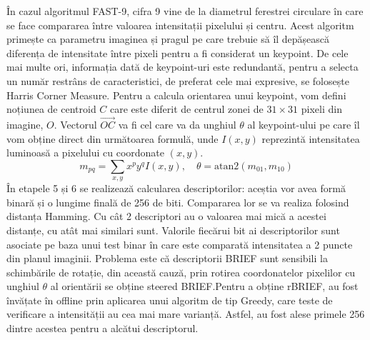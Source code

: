\documentclass[12pt,a4paper]{report}
\begin{document}
În cazul algoritmul FAST-9, cifra 9 vine de la diametrul ferestrei circulare în care se face compararea între valoarea 
intensitații pixelului și centru. Acest algoritm primește ca parametru imaginea și pragul 
pe care trebuie să îl depășească diferența de intensitate între pixeli pentru a fi considerat
un keypoint. De cele mai multe ori, informația dată de keypoint-uri este redundantă, pentru
a selecta un număr restrâns de caracteristici, de preferat cele mai expresive, se folosește Harris
Corner Measure. Pentru a calcula orientarea unui keypoint, vom defini noțiunea de centroid  $ C $ 
care este diferit de centrul zonei de $ 31 \times 31 $ pixeli din imagine, $ O $. Vectorul $ \vec{OC} $ va fi cel 
care va da unghiul $ \theta $ al keypoint-ului pe care îl vom obține direct din următoarea 
formulă, unde $ I(x, y) $ reprezintă intensitatea luminoasă a pixelului cu coordonate $ (x, y) $.      
\begin{equation}
m_{pq} = \sum_{x, y} x^p y^q I(x, y), \quad{}
\theta = \text{atan2}(m_{01}, m_{10})
\end{equation}
În etapele 5 și 6 se realizează calcularea descriptorilor: aceștia vor avea formă binară și o 
lungime finală de 256 de biti. Compararea lor se va realiza folosind distanța Hamming. Cu cât 
2 descriptori au o valoarea mai mică a acestei distanțe, cu atât mai similari sunt. Valorile 
fiecărui bit ai descriptorilor sunt asociate pe baza unui test binar în care este comparată intensitatea a 2 
puncte din planul imaginii. Problema este că descriptorii BRIEF sunt sensibili la schimbările de
rotație, din această cauză, prin rotirea coordonatelor pixelilor cu unghiul $ \theta $ al 
orientării se obține steered BRIEF.\@ Pentru a obține rBRIEF, au fost învățate în offline prin
aplicarea unui algoritm de tip Greedy, care teste de verificare a intensității au cea mai mare 
varianță. Astfel, au fost alese primele 256 dintre acestea pentru a alcătui descriptorul.       
\end{document}
